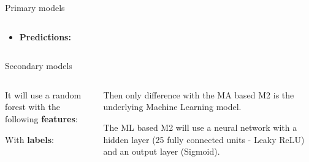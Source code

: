 \documentclass{beamer} %
\begin{document}
\begin{frame}{Primary models}
\begin{columns}
\begin{column}{.45\textwidth}
\begin{block}{}
\begin{itemize}
		\vspace{.2cm}		
		\item \textbf{Predictions:} 
	\end{itemize}
	\end{block}
\end{column}
\end{columns}

\end{frame}

\begin{frame}{Secondary models}
\begin{columns}
\begin{column}{.45\textwidth}
	\begin{block}{}
	It will use a random forest with the following \textbf{features}:
	
	\vspace{.2cm}	
	
	
	\vspace{.2cm}
	With \textbf{labels}:
	
	\vspace{.2cm}

	\end{block}
\end{column}

\begin{column}{.45\textwidth}
	\begin{block}{}
	Then only difference with the MA based M2 is the underlying Machine 
	Learning model.\\
	
	\vspace{.2cm}
	
	The 	ML based M2 will use a neural network with a hidden layer (25 fully 
	connected units - Leaky ReLU) and an output layer (Sigmoid).

	\end{block}
\end{column}
\end{columns}

\end{frame}
\end{document}
